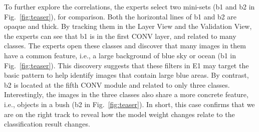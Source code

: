 \documentclass[format=acmsmall, review=false, screen=true]{acmart}
\newcommand{\dy}{\textcolor[rgb]{0,0,0}}
\begin{document}
To further explore the correlations,
the experts select two mini-sets (b1 and b2 in Fig.~\ref{fig:teaser}), for comparison. Both the horizontal lines of b1 and b2 are opaque and thick.
By tracking them in the Layer View and the Validation View, the experts can see that b1 is in the first CONV layer, and related to many classes.
The experts open these classes and discover that many images in them have a common feature, i.e., a large background of blue sky or ocean (b1 in Fig.~\ref{fig:teaser}).
This discovery suggests that these filters in E1 may target the basic pattern to help identify images that contain large blue areas.
By contrast, b2 is located at the fifth \dy{CONV module} and related to only three classes.
Interestingly, the images in the three classes also share a more concrete feature, i.e., objects in a bush (b2 in Fig.~\ref{fig:teaser}).
\dy{In short, this case confirms that we are on the right track to reveal how the model weight changes relate to the classification result changes.}%
\end{document}
